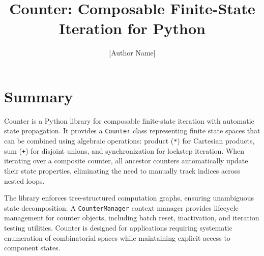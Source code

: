 \documentclass[10pt,a4paper,onecolumn]{article}
\title{Counter: Composable Finite-State Iteration for Python}
\author[1]{[Author Name]}
\affil[1]{[Institution], [City], [Country]}
\date{}
\begin{document}
\maketitle


\section{Summary}

Counter is a Python library for composable finite-state iteration with automatic
state propagation. It provides a \texttt{Counter} class representing finite state
spaces that can be combined using algebraic operations: product (\texttt{*}) for
Cartesian products, sum (\texttt{+}) for disjoint unions, and synchronization for
lockstep iteration. When iterating over a composite counter, all ancestor counters
automatically update their state properties, eliminating the need to manually
track indices across nested loops.

The library enforces tree-structured computation graphs, ensuring unambiguous
state decomposition. A \texttt{CounterManager} context manager provides lifecycle
management for counter objects, including batch reset, inactivation, and iteration
testing utilities. Counter is designed for applications requiring systematic
enumeration of combinatorial spaces while maintaining explicit access to component
states.
\end{document}
